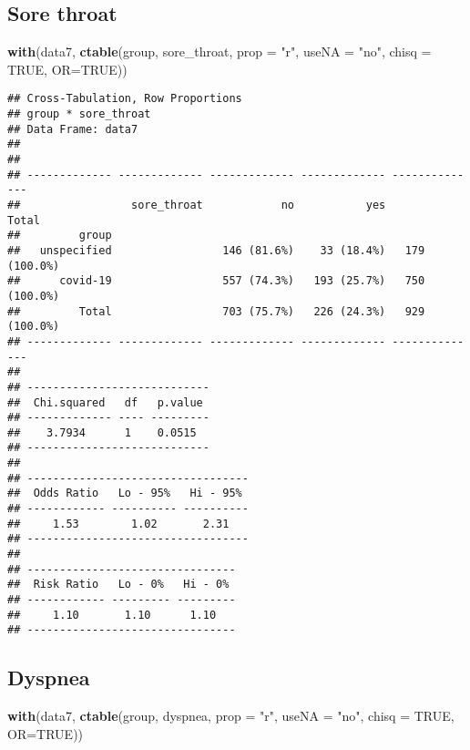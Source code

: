 \documentclass[
]{article}
\newenvironment{Shaded}{\begin{snugshade}}{\end{snugshade}}
\newcommand{\DataTypeTok}[1]{\textcolor[rgb]{0.13,0.29,0.53}{#1}}
\newcommand{\KeywordTok}[1]{\textcolor[rgb]{0.13,0.29,0.53}{\textbf{#1}}}
\newcommand{\NormalTok}[1]{#1}
\newcommand{\OtherTok}[1]{\textcolor[rgb]{0.56,0.35,0.01}{#1}}
\newcommand{\StringTok}[1]{\textcolor[rgb]{0.31,0.60,0.02}{#1}}
\begin{document}
\hypertarget{sore-throat}{%
\subsection{Sore throat}\label{sore-throat}}

\begin{Shaded}
\begin{Highlighting}[]
\KeywordTok{with}\NormalTok{(data7, }\KeywordTok{ctable}\NormalTok{(group, sore_throat, }\DataTypeTok{prop =} \StringTok{"r"}\NormalTok{, }\DataTypeTok{useNA =} \StringTok{"no"}\NormalTok{, }\DataTypeTok{chisq =} \OtherTok{TRUE}\NormalTok{, }\DataTypeTok{OR=}\OtherTok{TRUE}\NormalTok{))}
\end{Highlighting}
\end{Shaded}

\begin{verbatim}
## Cross-Tabulation, Row Proportions  
## group * sore_throat  
## Data Frame: data7  
## 
## 
## ------------- ------------- ------------- ------------- --------------
##                 sore_throat            no           yes          Total
##         group                                                         
##   unspecified                 146 (81.6%)    33 (18.4%)   179 (100.0%)
##      covid-19                 557 (74.3%)   193 (25.7%)   750 (100.0%)
##         Total                 703 (75.7%)   226 (24.3%)   929 (100.0%)
## ------------- ------------- ------------- ------------- --------------
## 
## ----------------------------
##  Chi.squared   df   p.value 
## ------------- ---- ---------
##    3.7934      1    0.0515  
## ----------------------------
## 
## ----------------------------------
##  Odds Ratio   Lo - 95%   Hi - 95% 
## ------------ ---------- ----------
##     1.53        1.02       2.31   
## ----------------------------------
## 
## --------------------------------
##  Risk Ratio   Lo - 0%   Hi - 0% 
## ------------ --------- ---------
##     1.10       1.10      1.10   
## --------------------------------
\end{verbatim}

\hypertarget{dyspnea}{%
\subsection{Dyspnea}\label{dyspnea}}

\begin{Shaded}
\begin{Highlighting}[]
\KeywordTok{with}\NormalTok{(data7, }\KeywordTok{ctable}\NormalTok{(group, dyspnea, }\DataTypeTok{prop =} \StringTok{"r"}\NormalTok{, }\DataTypeTok{useNA =} \StringTok{"no"}\NormalTok{, }\DataTypeTok{chisq =} \OtherTok{TRUE}\NormalTok{, }\DataTypeTok{OR=}\OtherTok{TRUE}\NormalTok{))}
\end{Highlighting}
\end{Shaded}
\end{document}
